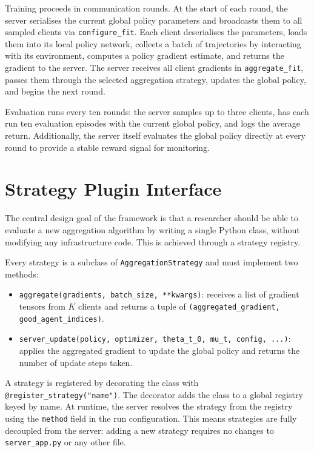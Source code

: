 \documentclass[a4paper, oneside]{discothesis}
\begin{document}
Training proceeds in communication rounds. At the start of each round, the server serialises the current global policy parameters and broadcasts them to all sampled clients via \texttt{configure\_fit}. Each client deserialises the parameters, loads them into its local policy network, collects a batch of trajectories by interacting with its environment, computes a policy gradient estimate, and returns the gradient to the server. The server receives all client gradients in \texttt{aggregate\_fit}, passes them through the selected aggregation strategy, updates the global policy, and begins the next round.

Evaluation runs every ten rounds: the server samples up to three clients, has each run ten evaluation episodes with the current global policy, and logs the average return. Additionally, the server itself evaluates the global policy directly at every round to provide a stable reward signal for monitoring.

\section{Strategy Plugin Interface}
\label{sec:plugin}

The central design goal of the framework is that a researcher should be able to evaluate a new aggregation algorithm by writing a single Python class, without modifying any infrastructure code. This is achieved through a strategy registry.

Every strategy is a subclass of \texttt{AggregationStrategy} and must implement two methods:

\begin{itemize}
    \item \texttt{aggregate(gradients, batch\_size, **kwargs)}: receives a list of gradient tensors from $K$ clients and returns a tuple of \texttt{(aggregated\_gradient, good\_agent\_indices)}.
    \item \texttt{server\_update(policy, optimizer, theta\_t\_0, mu\_t, config, ...)}: applies the aggregated gradient to update the global policy and returns the number of update steps taken.
\end{itemize}

A strategy is registered by decorating the class with \texttt{@register\_strategy("name")}. The decorator adds the class to a global registry keyed by name. At runtime, the server resolves the strategy from the registry using the \texttt{method} field in the run configuration. This means strategies are fully decoupled from the server: adding a new strategy requires no changes to \texttt{server\_app.py} or any other file.
\end{document}
